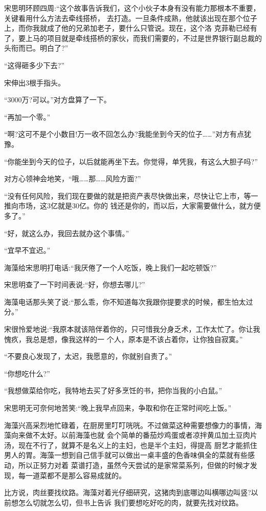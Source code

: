 \documentclass[11pt,a4paper,onecolumn]{article}
\begin{document}
宋思明环顾四周:``这个故事告诉我们，这个小伙子本身有没有能力那根本不重要，关键看用什么方法去牵线搭桥，
去打造。一旦条件成熟，他就该出现在那个位子上，而你我就成了他的兄弟加老子，要什么只管说。现在，这个洛
克菲勒已经有了，要上马的项目就是牵线搭桥的家伙，而我们需要的，不过是世界银行副总裁的头衔而已。明白了?''

``这得砸多少下去?''

宋伸出3根手指头。

``3000万?可以。''对方盘算了一下。

``再加一个零。''

``啊?这可不是个小数目!万一收不回怎么办?我能坐到今天的位子……''对方有点犹豫。

``你能坐到今天的位子，以后就能再坐下去。你觉得，单凭我，有这么大胆子吗?''

对方心领神会地笑，``哦……那……风险方面?''

``没有任何风险，我们现在要做的就是把资产表尽快做出来，尽快让它上市，等一推向市场，这3亿就是30亿。你的
钱还是你的，而以后，大家需要做什么，就方便多了。''

``好，就这么办，我回去就办这个事情。''

``宜早不宜迟。''

海藻给宋思明打电话:``我厌倦了一个人吃饭，晚上我们一起吃顿饭?''

宋思明查了一下时间表说:``好，你想去哪儿?''

海藻电话那头笑了说:``那么乖，你不知道每次我跟你提要求的时候，都生怕太过分。''

宋很怜爱地说:``我原本就该陪伴着你的，只可惜我分身乏术，工作太忙了。你让我愧疚，我总是想，像我这样的一
个人，原本是不该占着你，让你独自寂寞。''

``不要良心发现了，太迟，我愿意的，你就别自责了。''

``你想吃什么?''

``我想做菜给你吃，我特地去买了好多烹饪的书，把你当我的小白鼠。''

宋思明无可奈何地苦笑:``晚上我早点回来，争取和你在正常时间吃上饭。''

海藻兴高采烈地忙碌着，在厨房里叮叮咣咣。不过做菜这种需要想像力的事情，海藻向来做不太好。以前海藻也就
会个简单的番茄炒鸡蛋或者凉拌黄瓜加土豆肉片汤，现在不行了，就算不是名义上的主妇，也是半个主妇，得提高
厨艺才能抓住男人的胃。海藻一想到自己信手就可以做出一桌丰盛的色香味俱全的菜就有些感动，所以正努力对着
菜谱打造，虽然今天尝试的是家常菜系列，但做的时候才发现，每一道菜都不是那么容易成就的。

比方说，肉丝要找纹路。海藻对着光仔细研究，这猪肉到底哪边叫横哪边叫竖?以前想怎么切就怎么切，但书上告诉
我们要想吃好吃的肉，就要先找对纹路。
\end{document}
